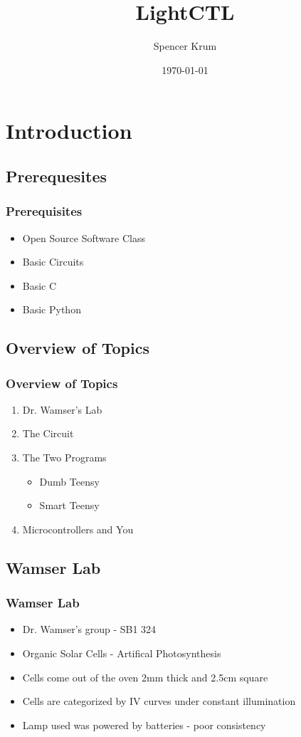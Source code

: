 \documentclass{beamer}
\title{LightCTL}
\date{\today}
\author{Spencer Krum}
\begin{document}
\frame{\titlepage}

\section{Introduction}
\subsection{Prerequesites}
\frame
{
	\frametitle{Prerequisites}
	\begin{itemize}
		\item Open Source Software Class
		\item Basic Circuits
		\item Basic C
		\item Basic Python
	\end{itemize}
}

\subsection{Overview of Topics}
\frame
{
	\frametitle{Overview of Topics}
	\begin{enumerate}
		\item Dr. Wamser's Lab
		\item The Circuit
		\item The Two Programs
		\begin{itemize}
			\item Dumb Teensy
			\item Smart Teensy
		\end{itemize}
		\item Microcontrollers and You
	\end{enumerate}
}

\subsection{Wamser Lab}
\frame
{
	\frametitle{Wamser Lab}
	\begin{itemize}
		\item Dr. Wamser's group - SB1 324
		\item Organic Solar Cells - Artifical Photosynthesis
		\item Cells come out of the oven 2mm thick and 2.5cm square
		\item Cells are categorized by IV curves under constant illumination
		\item Lamp used was powered by batteries - poor consistency
	\end{itemize}
}
\end{document}
